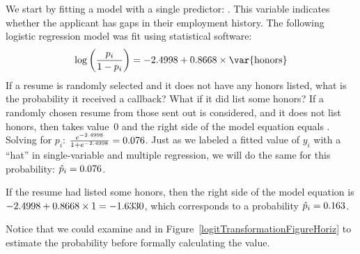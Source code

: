 \begin{examplewrap}
\begin{nexample}{We start by fitting a model with a single
    predictor: .
    This variable indicates whether the applicant has gaps in their
    employment history.
    The following logistic regression model was fit using
    statistical software:
    \begin{align*}
    \log\left( \frac{p_i}{1-p_i} \right)
      = \resHonorsInt{} +
          \resHonorsCoef{} \times\text{\var{honors}}
    \end{align*}
    If a resume is randomly selected and it does not have
    any honors listed, what is the probability it received
    a callback?
    What if it did list some honors?}
    \label{logisticExampleWithHonors}%
  If a randomly chosen resume from those sent out is considered,
  and it does not list honors, then  takes
  value~0 and the right side of the model equation equals
  \resHonorsInt{}.
  Solving for $p_i$:
  $\frac{e^{-2.4998{}}}{1 + e^{-2.4998{}}}
      = 0.076{}$.
  Just as we labeled a fitted value of $y_i$ with a ``hat''
  in single-variable and multiple regression, we will do the
  same for this probability: $\hat{p}_i = 0.076{}$.

  If the resume had listed some honors,
  then the right side of the model equation is
  $-2.4998{} + 0.8668{} \times 1
      = -1.6330{}$,
  which corresponds to a probability
  $\hat{p}_i = 0.163{}$.

  Notice that we could examine \resHonorsInt{} and
  \resHonorsIntPlusCoef{} in
  Figure~\ref{logitTransformationFigureHoriz}
  to estimate the probability before formally calculating
  the value.
\end{nexample}
\end{examplewrap}


